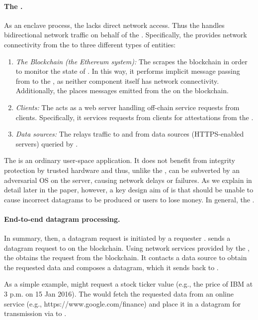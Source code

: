 \paragraph{The \medname.} As an enclave process, the \encname lacks direct network access. Thus the \medname handles bidirectional network traffic on behalf of the \encname. Specifically, the \medname provides network connectivity from the \encname to three different types of entities: 

\begin{enumerate}
\item {\em The Blockchain (the Ethereum system):}  The \medname scrapes the blockchain in order to monitor the state of \tcont. In this way, it performs implicit message passing from \tcont to the \encname, as neither component itself has network connectivity. Additionally, the \medname places messages emitted from the \encname on the blockchain.
\item {\em Clients:} The \medname acts as a web server handling off-chain service requests from clients. Specifically, it services requests from clients for attestations from the \encname.
\item {\em Data sources:} The \medname relays traffic to and from data sources (HTTPS-enabled servers) queried by \encname. 
\end{enumerate}

The \medname is an ordinary user-space application. It does not benefit from integrity protection by trusted hardware and thus, unlike the \encname, can be subverted by an adversarial OS on the \tc server, causing network delays or failures. As we explain in detail later in the paper, however, a key design aim of \tc is that \medname should be unable to cause incorrect datagrams to be produced or users to lose money. In general, the . 

\paragraph{End-to-end datagram processing.}
In summary, then, a datagram request is initiated by a requester \reqcont. \reqcont sends a datagram request to \tcont on the blockchain. Using network services provided by the \medname, the \encname obtains the request from the blockchain. It contacts a data source to obtain the requested data and composes a datagram, which it sends back to \reqcont.

As a simple example, \reqcont might request a stock ticker value (e.g., the price of IBM at 3 p.m. on 15 Jan 2016). The \encname would fetch the requested data from an online service (e.g., https://www.google.com/finance) and place it in a datagram for transmission via \tcont to \reqcont.

